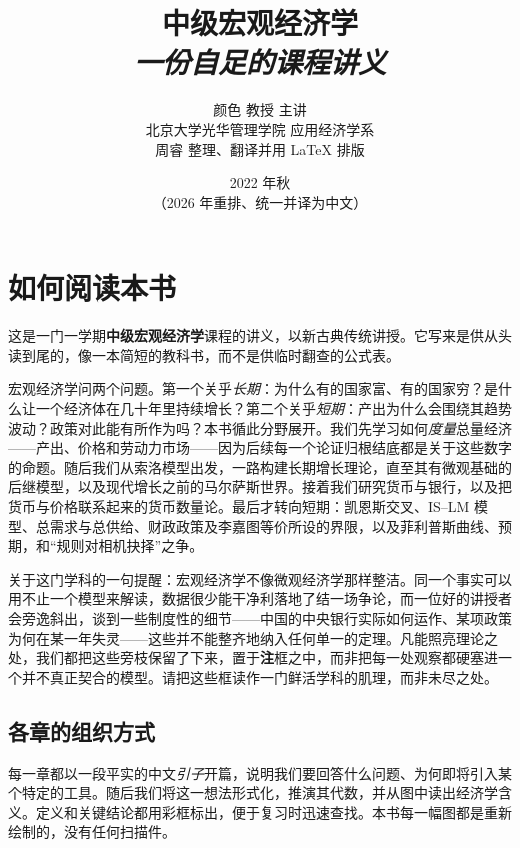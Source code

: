 \documentclass[oneside,fontset=macnew,UTF8]{ctexbook}
\def\notetitle{中级宏观经济学}
\def\notesubtitle{一份自足的课程讲义}
\def\noteauthor{颜色 教授 主讲 \\
    北京大学光华管理学院 \quad 应用经济学系 \\
    \vspace{0.5em}
    周睿 整理、翻译并用 {\LaTeX} 排版}
\def\notedate{2022 年秋 \\ \small（2026 年重排、统一并译为中文）}
\begin{document}
\title{\textbf{
    \LARGE{\notetitle}\\
    \vspace{0.5em}
    \large\textit{\notesubtitle}
    \vspace*{8\baselineskip}}
}
\author{\noteauthor}
\date{\notedate}

\maketitle
\newpage

\thispagestyle{empty}
\section*{如何阅读本书}

这是一门一学期\textbf{中级宏观经济学}课程的讲义，以新古典传统讲授。它写来是供从头读到尾的，像一本简短的教科书，而不是供临时翻查的公式表。

宏观经济学问两个问题。第一个关乎\emph{长期}：为什么有的国家富、有的国家穷？是什么让一个经济体在几十年里持续增长？第二个关乎\emph{短期}：产出为什么会围绕其趋势波动？政策对此能有所作为吗？本书循此分野展开。我们先学习如何\emph{度量}总量经济——产出、价格和劳动力市场——因为后续每一个论证归根结底都是关于这些数字的命题。随后我们从索洛模型出发，一路构建长期增长理论，直至其有微观基础的后继模型，以及现代增长之前的马尔萨斯世界。接着我们研究货币与银行，以及把货币与价格联系起来的货币数量论。最后才转向短期：凯恩斯交叉、IS--LM 模型、总需求与总供给、财政政策及李嘉图等价所设的界限，以及菲利普斯曲线、预期，和“规则对相机抉择”之争。

关于这门学科的一句提醒：宏观经济学不像微观经济学那样整洁。同一个事实可以用不止一个模型来解读，数据很少能干净利落地了结一场争论，而一位好的讲授者会旁逸斜出，谈到一些制度性的细节——中国的中央银行实际如何运作、某项政策为何在某一年失灵——这些并不能整齐地纳入任何单一的定理。凡能照亮理论之处，我们都把这些旁枝保留了下来，置于\textbf{注}框之中，而非把每一处观察都硬塞进一个并不真正契合的模型。请把这些框读作一门鲜活学科的肌理，而非未尽之处。

\subsection*{各章的组织方式}

每一章都以一段平实的中文\emph{引子}开篇，说明我们要回答什么问题、为何即将引入某个特定的工具。随后我们将这一想法形式化，推演其代数，并从图中读出经济学含义。定义和关键结论都用彩框标出，便于复习时迅速查找。本书每一幅图都是重新绘制的，没有任何扫描件。
\end{document}
